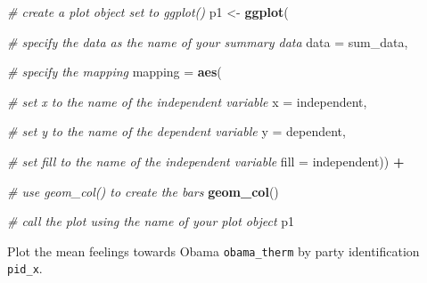 \documentclass[
]{book}
\newenvironment{Shaded}{\begin{snugshade}}{\end{snugshade}}
\newcommand{\AttributeTok}[1]{\textcolor[rgb]{0.13,0.29,0.53}{#1}}
\newcommand{\CommentTok}[1]{\textcolor[rgb]{0.56,0.35,0.01}{\textit{#1}}}
\newcommand{\FunctionTok}[1]{\textcolor[rgb]{0.13,0.29,0.53}{\textbf{#1}}}
\newcommand{\NormalTok}[1]{#1}
\newcommand{\OtherTok}[1]{\textcolor[rgb]{0.56,0.35,0.01}{#1}}
\newcommand{\SpecialCharTok}[1]{\textcolor[rgb]{0.81,0.36,0.00}{\textbf{#1}}}
\begin{document}
\begin{Shaded}
\begin{Highlighting}[]
\CommentTok{\# create a plot object set to \textasciigrave{}ggplot()\textasciigrave{}}
\NormalTok{p1 }\OtherTok{\textless{}{-}} \FunctionTok{ggplot}\NormalTok{(}
  
  \CommentTok{\# specify the data as the name of your summary data}
  \AttributeTok{data =}\NormalTok{ sum\_data,}
  
  \CommentTok{\# specify the mapping}
  \AttributeTok{mapping =} \FunctionTok{aes}\NormalTok{(}
    
    \CommentTok{\# set x to the name of the independent variable}
    \AttributeTok{x =}\NormalTok{ independent,}
    
    \CommentTok{\# set y to the name of the dependent variable}
    \AttributeTok{y =}\NormalTok{ dependent,}
    
    \CommentTok{\# set \textasciigrave{}fill\textasciigrave{} to the name of the independent variable}
    \AttributeTok{fill =}\NormalTok{ independent)) }\SpecialCharTok{+}
  
  \CommentTok{\# use \textasciigrave{}geom\_col() to create the bars}
  \FunctionTok{geom\_col}\NormalTok{()}

\CommentTok{\# call the plot using the name of your plot object}
\NormalTok{p1}
\end{Highlighting}
\end{Shaded}

Plot the mean feelings towards Obama \texttt{obama\_therm} by party identification \texttt{pid\_x}.
\end{document}
